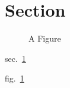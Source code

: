 \section{Section}\label{sec:section}

\begin{figure}
\centering
{}
\caption{A Figure}\label{fig:figure}
\end{figure}

sec.~\ref{sec:section}

fig.~\ref{fig:figure}
